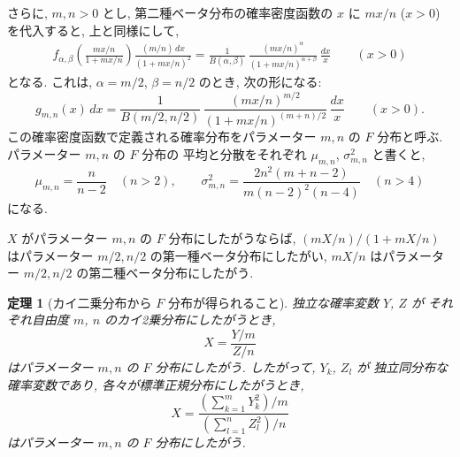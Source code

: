 \documentclass[12pt,twoside]{jarticle}
\theoremstyle{jplain}
\newtheorem{theorem}{定理}
\theoremstyle{jplain}
\theoremstyle{jplain}
\numberwithin{theorem}{section}
\numberwithin{equation}{section}
\numberwithin{figure}{section}
\numberwithin{table}{section}
\begin{document}
さらに, $m,n>0$ とし,
第二種ベータ分布の確率密度函数の $x$ に $mx/n$ ($x>0$) を代入すると,
上と同様にして,
\begin{align*}
f_{\alpha,\beta}\left( \frac{mx/n}{1+mx/n} \right) \frac{(m/n)\,dx}{(1+mx/n)^2}
=
\frac{1}{B(\alpha,\beta)}\,
\frac{(mx/n)^\alpha}{(1+mx/n)^{\alpha+\beta}}
\,\frac{dx}{x}
\qquad (x>0)
\end{align*}
となる.  これは, $\alpha=m/2$, $\beta=n/2$ のとき, 次の形になる:
\[
g_{m,n}(x)\,dx
=
\frac{1}{B(m/2,n/2)}\,
\frac{(mx/n)^{m/2}}{(1+mx/n)^{(m+n)/2}}
\,\frac{dx}{x}
\qquad (x>0).
\]
この確率密度函数で定義される確率分布をパラメーター $m,n$ の $F$ 分布と呼ぶ.
パラメーター $m,n$ の $F$ 分布の
平均と分散をそれぞれ $\mu_{m,n}$, $\sigma_{m,n}^2$ と書くと,
\[
\mu_{m,n}=\frac{n}{n-2} \quad (n>2), \qquad
\sigma_{m,n}^2 = \frac{2n^2(m+n-2)}{m(n-2)^2(n-4)} \quad (n>4)
\]
になる.

$X$ がパラメーター $m,n$ の $F$ 分布にしたがうならば,
$(mX/n)/(1+mX/n)$ はパラメーター $m/2,n/2$ の第一種ベータ分布にしたがい,
$mX/n$ はパラメーター $m/2,n/2$ の第二種ベータ分布にしたがう.

\begin{theorem}[カイ二乗分布から $F$ 分布が得られること]
\label{theorem:F}
独立な確率変数 $Y$, $Z$ が
それぞれ自由度 $m$, $n$ のカイ2乗分布にしたがうとき,
\[
X = \frac{Y/m}{Z/n}
\]
はパラメーター $m,n$ の $F$ 分布にしたがう.
したがって, $Y_k$, $Z_l$ が
独立同分布な確率変数であり,
各々が標準正規分布にしたがうとき,
\[
X=
\frac
{\left(\sum_{k=1}^m Y_k^2\right)/m}
{\left(\sum_{l=1}^n Z_l^2\right)/n}
\]
はパラメーター $m,n$ の $F$ 分布にしたがう.
\end{theorem}
\end{document}
